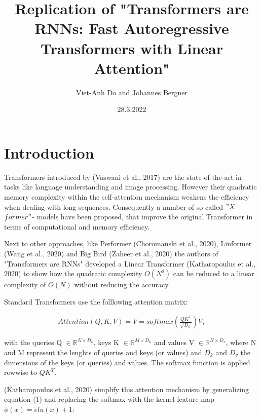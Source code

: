 \documentclass[DIV=13,fontsize=11pt]{scrartcl}
\title{Replication of "Transformers are RNNs: Fast Autoregressive Transformers with Linear Attention"}
\author{Viet-Anh Do and Johannes Bergner}
\date{28.3.2022}
\begin{document}
\maketitle
\section{Introduction}

Transformers introduced by (Vaswani et al., 2017) are the state-of-the-art in  tasks like language understanding and image processing.  However their quadratic memory complexity within the self-attention mechanism weakens the efficiency when dealing with long sequences.  
Consequently a number of so called \("X\)-\(former"\)- models have been proposed, that improve the original Transformer in terms of computational and memory efficiency.

Next to other approaches, like Performer (Choromanski et al., 2020), Linformer (Wang et al., 2020) and Big Bird (Zaheer et al., 2020) the authors of "Transformers are RNNs" developed a Linear Transformer (Katharopoulus et al., 2020) to show how the quadratic complexity \(O(N^2)\)  can be reduced to a linear complexity of \(O(N)\) without reducing the accuracy.

Standard Transformers use the folllowing attention matrix:

\begin{align}
    Attention(Q, K, V) {=} V {=} softmax \left(\frac {QK^T}{\sqrt{D_{k}}}\right) V,
\end{align}

with the queries Q \( \in \mathbb{R}^{N \times D_{k}}\),  keys K \(\in \mathbb{R}^{M \times D_{k}}\) and values V \( \in \mathbb{R}^{N \times D_{v}}\), where N and M represent the lenghts of queries and keys (or values) and \(D_{k}\) and \(D_{v}\) the dimensions of the keys (or queries) and values. The softmax function is applied rowwise to \(QK^T\).

(Katharopoulus et al., 2020) simplify this attention mechanism by generalizing equation (1) and replacing the softmax with the kernel feature map \(\phi (x) {=} elu(x) +1\):
\end{document}
